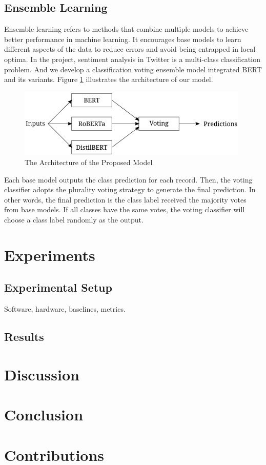 \documentclass[runningheads]{llncs}
\begin{document}
\subsection{Ensemble Learning}
Ensemble learning refers to methods that combine multiple models to achieve better performance in machine learning. It encourages base models to learn different aspects of the data to reduce errors and avoid being entrapped in local optima. In the project, sentiment analysis in Twitter is a multi-class classification problem. And we develop a classification voting ensemble model integrated BERT and its variants. Figure \ref{fig:model} illustrates the architecture of our model.

\begin{figure}[!ht]
    \centering
    \includegraphics[width=11cm]{./figs/model.png}
    \caption{The Architecture of the Proposed Model}
    \label{fig:model}
\end{figure}

Each base model outputs the class prediction for each record. Then, the voting classifier adopts the plurality voting strategy to generate the final prediction. In other words, the final prediction is the class label received the majority votes from base models. If all classes have the same votes, the voting classifier will choose a class label randomly as the output.


\section{Experiments}
\subsection{Experimental Setup}
Software, hardware, baselines, metrics.

\subsection{Results}

\section{Discussion}
    
\section{Conclusion}
    
\section{Contributions}

%
%


%
\end{document}

